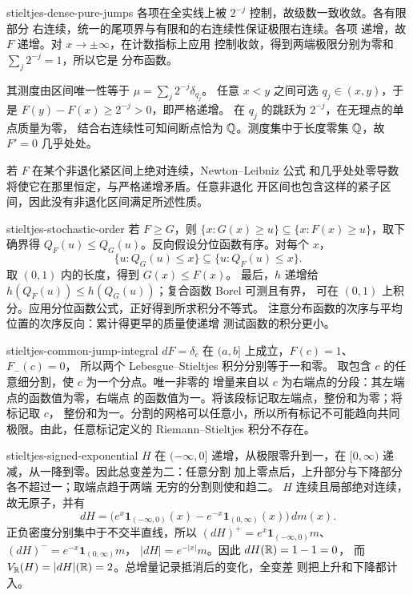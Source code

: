 \begin{solution}{stieltjes-dense-pure-jumps}
各项在全实线上被 \(2^{-j}\) 控制，故级数一致收敛。各有限部分
右连续，统一的尾项界与有限和的右连续性保证极限右连续。各项
递增，故 \(F\) 递增。对 \(x\to\pm\infty\)，在计数指标上应用
控制收敛，得到两端极限分别为零和 \(\sum_j2^{-j}=1\)，所以它是
分布函数。

其测度由区间唯一性等于 \(\mu=\sum_j2^{-j}\delta_{q_j}\)。
任意 \(x<y\) 之间可选 \(q_j\in(x,y)\)，于是
\(F(y)-F(x)\ge2^{-j}>0\)，即严格递增。
在 \(q_j\) 的跳跃为 \(2^{-j}\)，在无理点的单点质量为零，
结合右连续性可知间断点恰为 \(\mathbb{Q}\)。测度集中于长度零集
\(\mathbb{Q}\)，故 \(F'=0\) 几乎处处。

若 \(F\) 在某个非退化紧区间上绝对连续，Newton--Leibniz 公式
和几乎处处零导数将使它在那里恒定，与严格递增矛盾。任意非退化
开区间也包含这样的紧子区间，因此没有非退化区间满足所述性质。
\end{solution}

\begin{solution}{stieltjes-stochastic-order}
若 \(F\ge G\)，则
\(\{x:G(x)\ge u\}\subseteq\{x:F(x)\ge u\}\)，取下确界得
\(Q_F(u)\le Q_G(u)\)。反向假设分位函数有序。对每个 \(x\)，
\[
 \{u:Q_G(u)\le x\}\subseteq\{u:Q_F(u)\le x\}.
\]
取 \((0,1)\) 内的长度，得到 \(G(x)\le F(x)\)。
最后，\(h\) 递增给
\(h(Q_F(u))\le h(Q_G(u))\)；复合函数 Borel 可测且有界，
可在 \((0,1)\) 上积分。应用分位函数公式，正好得到所求积分不等式。
注意分布函数的次序与平均位置的次序反向：累计得更早的质量使递增
测试函数的积分更小。
\end{solution}

\begin{solution}{stieltjes-common-jump-integral}
\(dF=\delta_c\) 在 \((a,b]\) 上成立，\(F(c)=1\)、\(F_-(c)=0\)，
所以两个 Lebesgue--Stieltjes 积分分别等于一和零。
取包含 \(c\) 的任意细分割，使 \(c\) 为一个分点。唯一非零的
增量来自以 \(c\) 为右端点的分段：其左端点的函数值为零，右端点
的函数值为一。将该段标记取左端点，整份和为零；将标记取 \(c\)，
整份和为一。分割的网格可以任意小，所以所有标记不可能趋向共同
极限。由此，任意标记定义的 Riemann--Stieltjes 积分不存在。
\end{solution}

\begin{solution}{stieltjes-signed-exponential}
\(H\) 在 \(({-\infty},0]\) 递增，从极限零升到一，在
\([0,\infty)\) 递减，从一降到零。因此总变差为二：任意分割
加上零点后，上升部分与下降部分各不超过一；取端点趋于两端
无穷的分割则使和趋二。
\(H\) 连续且局部绝对连续，故无原子，并有
\[
 dH=\bigl(e^x\mathbf1_{(-\infty,0)}(x)
       -e^{-x}\mathbf1_{(0,\infty)}(x)\bigr)\,dm(x).
\]
正负密度分别集中于不交半直线，所以
\((dH)^+=e^x\mathbf1_{(-\infty,0)}m\)、
\((dH)^-=e^{-x}\mathbf1_{(0,\infty)}m\)，
\(|dH|=e^{-|x|}m\)。因此 \(dH(\mathbb{R})=1-1=0\)，
而 \(V_{\mathbb{R}}(H)=|dH|(\mathbb{R})=2\)。总增量记录抵消后的变化，全变差
则把上升和下降都计入。
\end{solution}

